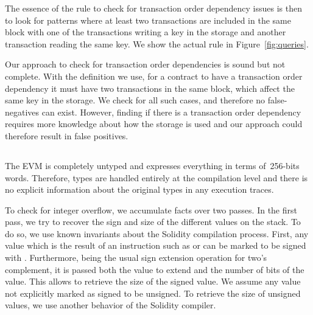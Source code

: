 The essence of the rule to check for transaction order dependency issues is then to look for patterns where at least two transactions are included in the same block with one of the transactions writing a key in the storage and another transaction reading the same key. We show the actual rule in Figure~\ref{fig:queries}.

\correctness Our approach to check for transaction order dependencies is sound but not complete. With the definition we use, for a contract to have a transaction order dependency it must have two transactions in the same block, which affect the same key in the storage. We check for all such cases, and therefore no false-negatives can exist. However, finding if there is a transaction order dependency requires more knowledge about how the storage is used and our approach could therefore result in false positives.


\subsection{\integeroverflow}
\label{ssec:method-io}

%
The EVM is completely untyped and expresses everything in terms of~256-bits words. Therefore, types are handled entirely at the compilation level and there is no explicit information about the original types in any execution traces.

To check for integer overflow, we accumulate facts over two passes. In the first pass, we try to recover the sign and size of the different values on the stack. To do so, we use known invariants about the Solidity compilation process. First, any value which is the result of an instruction such as  or  can be marked to be signed with . Furthermore,  being the usual sign extension operation for two's complement, it is passed both the value to extend and the number of bits of the value. This allows to retrieve the size of the signed value. We assume any value not explicitly marked as signed to be unsigned. To retrieve the size of unsigned values, we use another behavior of the Solidity compiler. 

